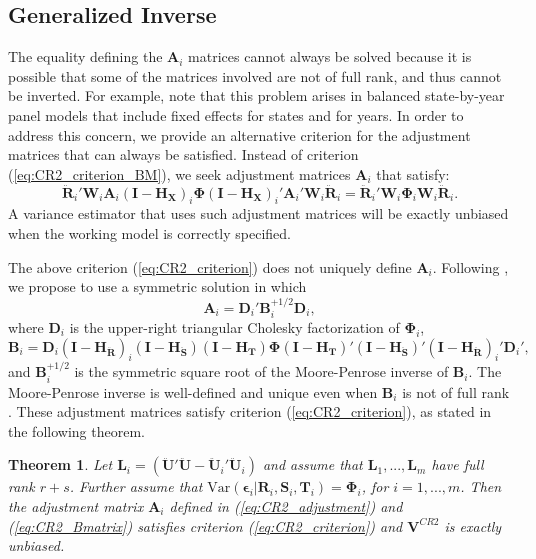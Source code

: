 \documentclass[12pt]{article}\usepackage[]{graphicx}\usepackage[]{color}
\newtheorem{thm}{Theorem}
\newcommand{\Var}{\text{Var}}
\newcommand{\bm}{\mathbf}
\newcommand{\bs}{\boldsymbol}
\begin{document}
\subsection{Generalized Inverse}

The equality defining the $\bm{A}_i$ matrices cannot always be solved because it is possible that some of the matrices involved are not of full rank, and thus cannot be inverted. 
For example, \citet{Angrist2009mostly} note that this problem arises in balanced state-by-year panel models that include fixed effects for states and for years. 
In order to address this concern, we provide an alternative criterion for the adjustment matrices that can always be satisfied. 
Instead of criterion (\ref{eq:CR2_criterion_BM}), we seek adjustment matrices $\bm{A}_i$ that satisfy:
\begin{equation}
\label{eq:CR2_criterion}
\bm{\ddot{R}}_i' \bm{W}_i \bm{A}_i \left(\bm{I} - \bm{H_X}\right)_i \bs\Phi \left(\bm{I} - \bm{H_X}\right)_i' \bm{A}_i' \bm{W}_i \bm{\ddot{R}}_i = \bm{\ddot{R}}_i' \bm{W}_i \bs\Phi_i \bm{W}_i \bm{\ddot{R}}_i.
\end{equation}
A variance estimator that uses such adjustment matrices will be exactly unbiased when the working model is correctly specified.

The above criterion (\ref{eq:CR2_criterion}) does not uniquely define $\bm{A}_i$. Following \citet{McCaffrey2001generalizations}, we propose to use a symmetric solution in which
\begin{equation}
\label{eq:CR2_adjustment}
\bm{A}_i = \bm{D}_i' \bm{B}_i^{+1/2} \bm{D}_i,
\end{equation}
where $\bm{D}_i$ is the upper-right triangular Cholesky factorization of $\bs\Phi_i$, 
\begin{equation}
\label{eq:CR2_Bmatrix}
\bm{B}_i = \bm{D}_i\left(\bm{I} - \bm{H_{\ddot{R}}}\right)_i \left(\bm{I} - \bm{H_{\ddot{S}}}\right) \left(\bm{I} - \bm{H_T}\right) \bs\Phi \left(\bm{I} - \bm{H_T}\right)' \left(\bm{I} - \bm{H_{\ddot{S}}}\right)' \left(\bm{I} - \bm{H_{\ddot{R}}}\right)_i' \bm{D}_i',
\end{equation}
and $\bm{B}_i^{+1/2}$ is the symmetric square root of the Moore-Penrose inverse of $\bm{B}_i $. 
The Moore-Penrose inverse is well-defined and unique even when $\bm{B}_i$ is not of full rank \citep[][Thm. 9.18]{Banerjee2014linear}. These adjustment matrices satisfy criterion (\ref{eq:CR2_criterion}), as stated in the following theorem.

\begin{thm}
\label{thm:BRL_FE_intext}
Let $\bm{L}_i = \left(\bm{\ddot{U}}'\bm{\ddot{U}} - \bm{\ddot{U}}_i'\bm{\ddot{U}}_i\right)$ and assume that $\bm{L}_1,...,\bm{L}_m$ have full rank $r + s$. Further assume that $\Var\left(\bs\epsilon_i\left|\bm{R}_i,\bm{S}_i,\bm{T}_i\right.\right) = \bs\Phi_i$, for $i = 1,...,m$. Then the adjustment matrix $\bm{A}_i$ defined in (\ref{eq:CR2_adjustment}) and (\ref{eq:CR2_Bmatrix}) satisfies criterion (\ref{eq:CR2_criterion}) and $\bm{V}^{CR2}$ is exactly unbiased.
\end{thm}
\end{document}
